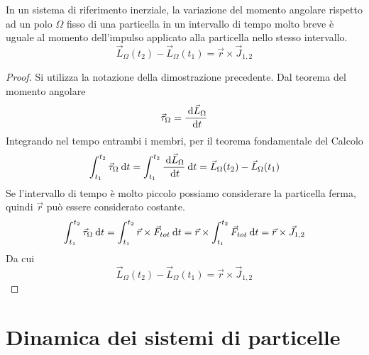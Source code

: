 \documentclass{article}
\theoremstyle{plain}
\begin{document}
\begin{shadedTheorem}
    In un sistema di riferimento inerziale, la variazione del momento angolare rispetto ad un polo $\Omega$ fisso di una particella in un intervallo di tempo molto breve è uguale al momento dell'impulso applicato alla particella nello stesso intervallo.
    \[\vec L_{\Omega}(t_2) -\vec L_{\Omega}(t_1) = \vec r \times \vec J_{1,2}\]
\end{shadedTheorem}
\begin{proof}
    Si utilizza la notazione della dimostrazione precedente. Dal teorema del momento angolare 
    \[\vec \tau_\Omega =\frac{\:\text{d} \vec L_{\Omega}}{\:\text{d} t}\]
    Integrando nel tempo entrambi i membri, per il teorema fondamentale del Calcolo
    \[\int_{t_1}^{t_2}\vec \tau_\Omega \:\text{d} t= \int_{t_1}^{t_2}\frac{\:\text{d} \vec L_{\Omega}}{\:\text{d} t}\:\text{d} t = \vec L_{\Omega}(t_2) -\vec L_{\Omega}(t_1)\]
    Se l'intervallo di tempo è molto piccolo possiamo considerare la particella ferma, quindi $\vec r$ può essere considerato costante.
    \[\int_{t_1}^{t_2}\vec \tau_\Omega \:\text{d} t = \int_{t_1}^{t_2}\vec r \times \vec F_{tot} \:\text{d} t = \vec r \times\int_{t_1}^{t_2} \vec F_{tot} \:\text{d} t = \vec r \times \vec J_{1,2}\]
    Da cui
    \[\vec L_{\Omega}(t_2) -\vec L_{\Omega}(t_1) = \vec r \times \vec J_{1,2}\]
\end{proof}
\section{Dinamica dei sistemi di particelle}
\end{document}
